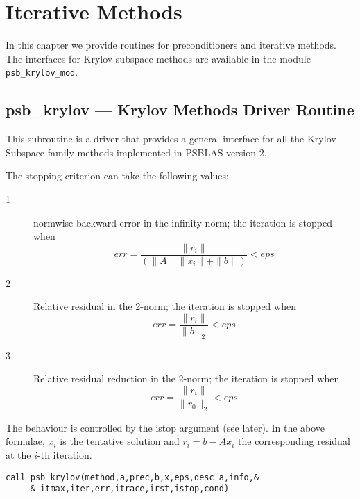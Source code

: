 \section{Iterative Methods}
\label{sec:methods}

In this chapter we provide routines for preconditioners and iterative
methods. The interfaces for Krylov subspace methods are available in
the module \verb|psb_krylov_mod|.

%
%

\clearpage\subsection*{psb\_krylov \label{krylov} --- Krylov Methods Driver
      Routine}

This subroutine is a driver that provides a general interface for all
the Krylov-Subspace family methods implemented in PSBLAS version 2. 

The stopping criterion can take the following values:
\begin{description}
\item[1]  normwise backward error  in the infinity
norm;  the iteration is stopped when 
\[ err = \frac{\|r_i\|}{(\|A\|\|x_i\|+\|b\|)} < eps \]
\item[2] Relative residual in the 2-norm; the iteration is stopped
when
\[ err = \frac{\|r_i\|}{\|b\|_2} < eps \]
\item[3] Relative residual reduction in the 2-norm; the iteration is stopped
when
\[ err = \frac{\|r_i\|}{\|r_0\|_2} < eps \]
\end{description}
The behaviour is controlled by  the  istop argument (see
later). In the above formulae, $x_i$ is the tentative solution and
$r_i=b-Ax_i$ the corresponding residual at the $i$-th iteration. 


\begin{lstlisting}
call psb_krylov(method,a,prec,b,x,eps,desc_a,info,&
     & itmax,iter,err,itrace,irst,istop,cond)
\end{lstlisting}

